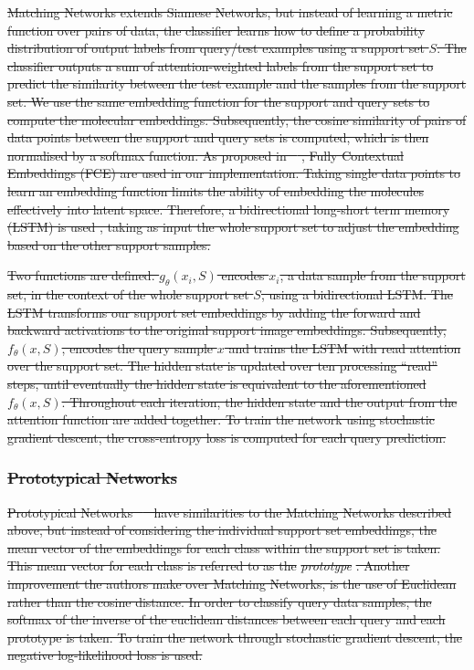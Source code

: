 \documentclass[journal=jcisd8,manuscript=article]{achemso} %
\providecommand{\DIFdel}[1]{{\protect\color{red}\sout{#1}}}                      %
\begin{document}
\DIFdel{Matching Networks extends Siamese Networks, but instead of learning a metric function over pairs of data, the classifier learns how to define a probability distribution of output labels from query/test examples using a support set $S$. The classifier outputs a sum of attention-weighted labels from the support set to predict the similarity between the test example and the samples from the support set. We use the same embedding function for the support and query sets to compute the molecular embeddings. Subsequently, the cosine similarity of pairs of data points between the support and query sets is computed, which is then normalised by a softmax function. As proposed in \mbox{%
\citet{vinyals2016matching}}\hspace{0pt}%
, Fully Contextual Embeddings (FCE) are used in our implementation. Taking single data points to learn an embedding function limits the ability of embedding the molecules effectively into latent space. Therefore, a bidirectional long-short term memory (LSTM) is used , taking as input the whole support set to adjust the embedding based on the other support samples.
}%

\DIFdel{Two functions are defined. $g_\theta(x_i, S)$ encodes $x_i$, a data sample from the support set, in the context of the whole support set $S$, using a bidirectional LSTM. The LSTM transforms our support set embeddings by adding the forward and backward activations to the original support image embeddings. Subsequently, $f_\theta(x, S)$, encodes the query sample $x$ and trains the LSTM with read attention over the support set. The hidden state is updated over ten processing ``read'' steps, until eventually the hidden state is equivalent to the aforementioned $f_\theta(x, S)$. Throughout each iteration, the hidden state and the output from the attention function are added together. To train the network using stochastic gradient descent, the cross-entropy loss is computed for each query prediction.
}%

\subsubsection{\DIFdel{Prototypical Networks}}
\addtocounter{subsubsection}{-1}%

\DIFdel{Prototypical Networks \mbox{%
\citep{snell2017prototypical} }\hspace{0pt}%
have similarities to the Matching Networks described above, but instead of considering the individual support set embeddings, the mean vector of the embeddings for each class within the support set is taken. This mean vector for each class is referred to as the }\textit{\DIFdel{prototype}}%
\DIFdel{. Another improvement the authors make over Matching Networks, is the use of Euclidean rather than the cosine distance. In order to classify query data samples, the softmax of the inverse of the euclidean distances between each query and each prototype is taken. To train the network through stochastic gradient descent, the negative log-likelihood loss is used. }%
\end{document}
